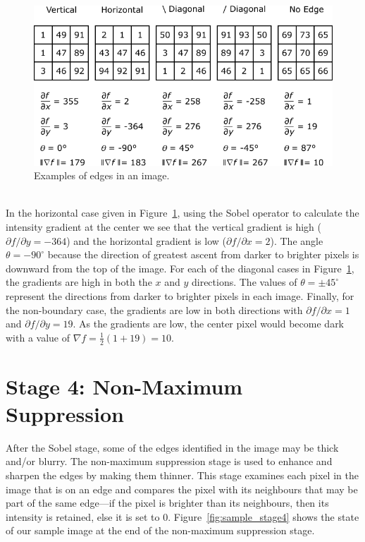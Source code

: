 \documentclass[epsfig,10pt,fullpage]{article}
\begin{document}
\begin{figure}[H]
   \begin{center}
       \includegraphics[scale = 1.0]{figures/edges.pdf}
   \end{center}
   \caption{Examples of edges in an image.}
	\label{fig:image_boundaries}
\end{figure}

~\\
\noindent
In the horizontal case given in Figure~\ref{fig:image_boundaries}, using
the Sobel operator to calculate the intensity gradient at the center we see that the 
vertical gradient is high (${\partial{f}}/{\partial{y}} = -364$) and the 
horizontal gradient is low (${\partial{f}}/{\partial{x}} =  2$). The angle $\theta =
-90^\circ$ because the direction of greatest ascent from darker to brighter pixels is
downward from the top of the image.  For each of the diagonal 
cases in Figure~\ref{fig:image_boundaries}, the gradients are high in both the $x$ and $y$ 
directions. The values of $\theta = \pm45^\circ$ represent the directions from darker to brighter
pixels in each image. Finally, for the non-boundary case, 
the gradients are low in both directions with ${\partial{f}}/{\partial{x}} = 1$ and 
${\partial{f}}/{\partial{y}} = 19$. As the gradients 
are low, the center pixel would become dark with a value of
$\nabla{f} = \frac{1}{2}(1 + 19) = 10$.

\noindent
\section*{Stage 4: Non-Maximum Suppression} 

\noindent
After the Sobel stage, some of the edges identified in the image may be thick and/or blurry. 
The non-maximum suppression stage is used to enhance and sharpen the edges by making them thinner. 
This stage examines each pixel in the image that is on an edge and 
compares the pixel with its neighbours that may be part of the same edge---if the pixel is 
brighter than its neighbours, then its intensity is retained, else it is set to 0.
Figure~\ref{fig:sample_stage4} shows the state of our sample image at the end of the 
non-maximum suppression stage. 
\end{document}
